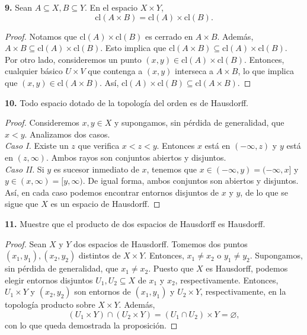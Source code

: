 \documentclass{article}
\begin{document}
\begin{mybox}
	\textbf{9. }Sean $A \subseteq X, B \subseteq Y$. En el espacio $X \times Y$,
	$$ \text{cl}(A \times B) = \text{cl}(A) \times \text{cl}(B) .$$
\end{mybox}	
\begin{proof}
	Notamos que $\text{cl}(A) \times \text{cl}(B)$ es cerrado en $A \times B$. Además, $A \times B \subseteq \text{cl}(A) \times \text{cl}(B)$. Esto implica que $\text{cl}(A \times B) \subseteq \text{cl}(A) \times \text{cl}(B)$.\\
	Por otro lado, consideremos un punto $(x, y) \in \text{cl}(A) \times \text{cl}(B)$. Entonces, cualquier básico $U \times V$ que contenga a $(x, y)$ interseca a $A \times B$, lo que implica que $(x, y) \in \text{cl}(A \times B)$. Así, $\text{cl}(A) \times \text{cl}(B) \subseteq \text{cl}(A \times B). $ 
\end{proof}

\begin{mybox}
	\textbf{10. } Todo espacio dotado de la topología del orden es de Hausdorff. 
\end{mybox}	
\begin{proof}
	Consideremos $x, y \in X$ y supongamos, sin pérdida de generalidad, que $x < y$. Analizamos dos casos. \\
	\textit{Caso I. } Existe un $z$ que verifica $x < z < y$. Entonces $x$ está en $(- \infty, z)$ y $y$ está en  $(z, \infty)$. Ambos rayos son conjuntos abiertos y disjuntos. \\
	\textit{Caso II. } Si $y$ es sucesor inmediato de $x$, tenemos que $x \in ( - \infty, y) = (- \infty,x]$ y $y \in (x, \infty) = [y, \infty)$. De igual forma, ambos conjuntos son abiertos y disjuntos. \\
	Así, en cada caso podemos encontrar entornos disjuntos de $x$ y $y$, de lo que se sigue que $X$ es un espacio de Hausdorff. 
\end{proof}

\begin{mybox}
\textbf{11. } Muestre que el producto de dos espacios de Hausdorff es Hausdorff. 	
\end{mybox}	
\begin{proof}
	Sean $X$ y $Y$ dos espacios de Hausdorff. Tomemos dos puntos $(x_{1}, y_{1}), (x_{2}, y_{2})$ distintos de $X \times Y$. Entonces, $x_{1} \neq x_{2}$ o $y_{1} \neq y_{2}$. Supongamos, sin pérdida de generalidad, que $x_{1} \neq x_{2}$. Puesto que $X$ es Hausdorff, podemos elegir entornos disjuntos $U_{1}, U_{2} \subseteq X$ de $x_{1}$ y $x_{2}$, respectivamente.  Entonces, $U_{1} \times Y$ y $(x_{2}, y_{2})$ son entornos de $(x_{1}, y_{1})$ y $U_{2} \times Y$, respectivamente, en la topología producto sobre $X \times Y$. Además, 
	$$ \left( U_{1} \times Y \right) \cap \left( U_{2} \times Y \right) =   \left( U_{1} \cap U_{2} \right) \times Y = \varnothing, $$
	con lo que queda demostrada la proposición. 
\end{proof}
\end{document}
